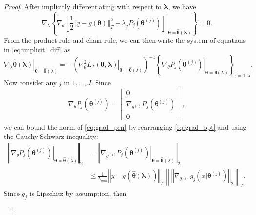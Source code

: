 \documentclass[10pt]{book}
\theoremstyle{definition}
\begin{document}
\begin{proof}
	After implicitly differentiating with respect to $\boldsymbol{\lambda}$, we have
	\begin{equation}
	\label{eq:implicit_diff}
	\nabla_{\lambda}\left\{ \left.\nabla_{\theta}
	\left [
	\frac{1}{2}\left\Vert y-g(\boldsymbol{\theta})\right\Vert _{T}^{2}+\lambda_{j}P_{j}(\boldsymbol{\theta}^{(j)})
	\right ]
	\right|_{\boldsymbol{\theta}=\hat{\boldsymbol{\theta}}(\boldsymbol{\lambda})}\right\} =0.
	\end{equation}
	From the product rule and chain rule, we can then write the system of equations in \eqref{eq:implicit_diff} as
	\begin{equation}
	\label{eq:param_matrix}
	\left . \nabla_{\lambda}\hat{\boldsymbol{\theta}}(\boldsymbol{\lambda})
	\right|_{\boldsymbol{\theta}=\hat{\boldsymbol{\theta}}(\lambda)}
	= -
	\left (
	\left.\nabla_{\theta}^2
	L_T(\boldsymbol{\theta}, \boldsymbol{\lambda})
	\right|_{\boldsymbol{\theta}=\hat{\boldsymbol{\theta}}(\lambda)} 
	\right)^{-1}
	\left \{
	\left.
	\nabla_{\theta}P_{j}(\boldsymbol{\theta}^{(j)})
	\right|_{\boldsymbol{\theta}=\hat{\boldsymbol{\theta}}(\lambda)}
	\right \}_{j=1:J}
	.
	\end{equation}
	Now consider any $j$ in $1,...,J$.
	Since
	\begin{align}
	\nabla_{\theta}P_{j}(\boldsymbol{\theta}^{(j)})
	= \left[
	\begin{matrix*}
	\boldsymbol {0} \\
	\nabla_{\theta^{(j)}}P_{j}(\boldsymbol{\theta}^{(j)}) \\
	\boldsymbol {0}
	\end{matrix*}
	\right],
	\label{eq:grad_pen}
	\end{align}
	we can bound the norm of \eqref{eq:grad_pen} by rearranging \eqref{eq:grad_opt} and using the Cauchy-Schwarz inequality:
	\begin{align*}
		\left\Vert \left.\nabla_{\theta}P_{j}(\boldsymbol{\theta}^{(j)})\right|_{\boldsymbol{\theta}=\hat{\boldsymbol{\theta}}(\lambda)}\right\Vert_2
		& = \left\Vert \left.\nabla_{\theta^{(j)}}P_{j}(\boldsymbol{\theta}^{(j)})\right|_{\boldsymbol{\theta}=\hat{\boldsymbol{\theta}}(\lambda)}\right\Vert_2
		\\
		&
		\le  \frac{1}{\lambda_{min}}\left\Vert y-g(\hat{\boldsymbol{\theta}}(\boldsymbol{\lambda}))\right\Vert _{T}
		\left \|
		\left\Vert
		\nabla_{\theta^{(j)}}g_{j}(x|\boldsymbol{\theta}^{(j)})
		\right\Vert_{2}
		\right \|_T.
	\end{align*}
	Since $g_j$ is Lipschitz by assumption, then
	\begin{align}

\end{align}
\end{proof}
\end{document}
